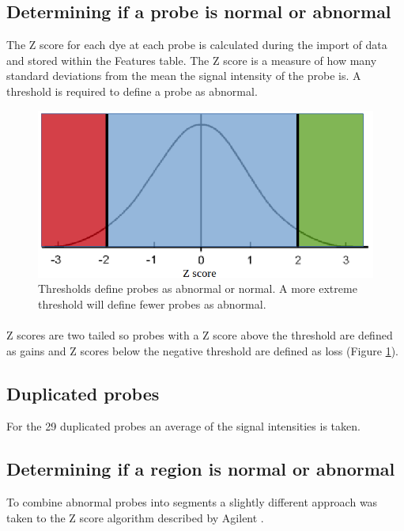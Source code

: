 \subsection{Determining if a probe is normal or abnormal}
The Z score for each dye at each probe is calculated during the import of data and stored within the Features table. 
The Z score is a measure of how many standard deviations from the mean the signal intensity of the probe is. A threshold is required to define a probe as abnormal.
\begin{figure}
\centering
\includegraphics[width=1\linewidth]{./Figures/normaldist}
\caption[The normal distribution]{Thresholds define probes as abnormal or normal. A more extreme threshold will define fewer probes as abnormal.}
\label{fig:normaldist}
\end{figure}

\paragraph*{}
Z scores are two tailed so probes with a Z score above the threshold are defined as gains and Z scores below the negative threshold are defined as loss (Figure \ref{fig:normaldist}).

\subsection{Duplicated probes}
For the 29 duplicated probes an average of the signal intensities is taken.
\subsection{Determining if a region is normal or abnormal}
To combine abnormal probes into segments a slightly different approach was taken to the Z score algorithm described by Agilent \cite{agilent_technologies_agilent_2011}.

